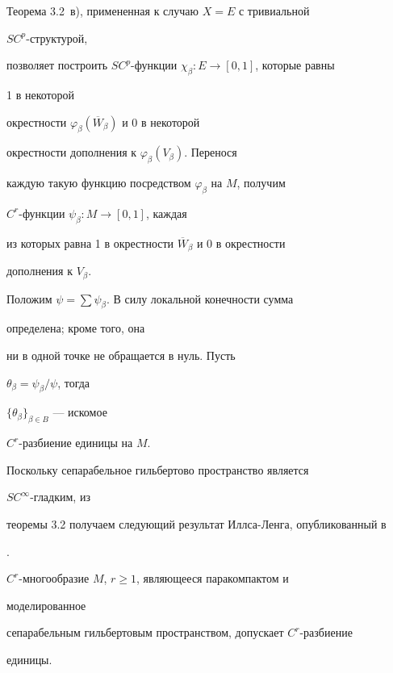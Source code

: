\begin{pf}


Теорема 3.2~в), примененная к случаю $X=E$ с тривиальной


$SC^p$-структурой,


позволяет построить $SC^p$-функции $\chi_\beta:E\to[0,1]$, которые равны


1 в некоторой


окрестности $\varphi_\beta(\overline W_\beta)$ и 0 в некоторой


окрестности дополнения к $\varphi_\beta(V_\beta)$. Перенося


каждую такую функцию посредством $\varphi_\beta$ на $M$, получим


$C^r$-функции $\psi_\beta:M\to[0,1]$, каждая


из которых равна 1 в окрестности $\overline W_\beta$ и 0 в окрестности


дополнения к $V_\beta$.


Положим $\psi=\sum\psi_\beta$. В силу локальной конечности сумма


определена; кроме того, она


ни в одной точке не обращается в нуль. Пусть


$\theta_\beta=\psi_\beta/\psi$, тогда


$\{\theta_\beta\}_{\beta\in B}$ --- искомое


$C^r$-разбиение единицы на $M$.


\end{pf}





Поскольку сепарабельное гильбертово пространство является


$SC^\infty$-гладким, из


теоремы 3.2 получаем следующий результат Иллса-Ленга, опубликованный в


\cite{6}.





\begin{cors}


$C^r$-многообразие $M$, $r\ge 1$, являющееся паракомпактом и


моделированное


сепарабельным гильбертовым пространством, допускает $C^r$-разбиение


единицы.


\end{cors}





